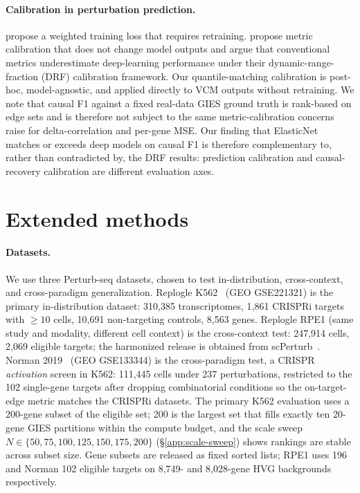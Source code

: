 \documentclass{article}
\theoremstyle{plain}
\theoremstyle{definition}
\theoremstyle{remark}
\begin{document}
\paragraph{Calibration in perturbation prediction.} \citet{mejia2025diversity} propose a weighted training loss that requires retraining. \citet{miller2025calibrated} propose metric calibration that does not change model outputs and argue that conventional metrics underestimate deep-learning performance under their dynamic-range-fraction (DRF) calibration framework. Our quantile-matching calibration is post-hoc, model-agnostic, and applied directly to VCM outputs without retraining. We note that causal F1 against a fixed real-data GIES ground truth is rank-based on edge sets and is therefore not subject to the same metric-calibration concerns \citet{miller2025calibrated} raise for delta-correlation and per-gene MSE. Our finding that ElasticNet matches or exceeds deep models on causal F1 is therefore complementary to, rather than contradicted by, the DRF results: prediction calibration and causal-recovery calibration are different evaluation axes.

\section{Extended methods}
\label{app:extended-methods}

\paragraph{Datasets.} We use three Perturb-seq datasets, chosen to test in-distribution, cross-context, and cross-paradigm generalization. Replogle K562~\citep{replogle2022} (GEO GSE221321) is the primary in-distribution dataset: 310{,}385 transcriptomes, 1{,}861 CRISPRi targets with $\geq 10$ cells, 10{,}691 non-targeting controls, 8{,}563 genes. Replogle RPE1 (same study and modality, different cell context) is the cross-context test: 247{,}914 cells, 2{,}069 eligible targets; the harmonized release is obtained from scPerturb~\citep{peidli2024scperturb}. Norman 2019~\citep{norman2019} (GEO GSE133344) is the cross-paradigm test, a CRISPR \emph{activation} screen in K562: 111{,}445 cells under 237 perturbations, restricted to the 102 single-gene targets after dropping combinatorial conditions so the on-target-edge metric matches the CRISPRi datasets. The primary K562 evaluation uses a 200-gene subset of the eligible set; 200 is the largest set that fills exactly ten 20-gene GIES partitions within the compute budget, and the scale sweep $N\in\{50,75,100,125,150,175,200\}$ (\S\ref{app:scale-sweep}) shows rankings are stable across subset size. Gene subsets are released as fixed sorted lists; RPE1 uses 196 and Norman 102 eligible targets on 8{,}749- and 8{,}028-gene HVG backgrounds respectively.
\end{document}
